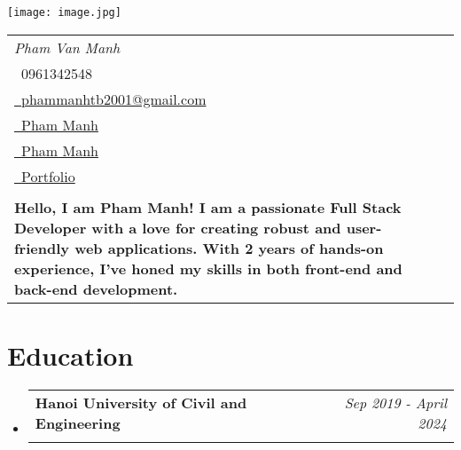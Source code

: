 \documentclass[a4paper,11pt]{article}
\makeatletter
\newcommand{\resumeSubheading}[4]{
\vspace{0.5mm}\item
    \begin{tabular*}{0.98\textwidth}[t]{l@{\extracolsep{\fill}}r}
        \textbf{#1} & \textit{\footnotesize{#4}} \\
        \textit{\footnotesize{#3}} &  \footnotesize{#2}\\
    \end{tabular*}
    \vspace{-2.4mm}
}
\newcommand{\resumeSubHeadingListStart}{\begin{itemize}[leftmargin=*,labelsep=0mm]}
\newcommand{\resumeSubHeadingListEnd}{\end{itemize}\vspace{2mm}}
\newcommand{\name}{Pham Van Manh} %
\newcommand{\phone}{0961342548} %
\newcommand{\emaila}{phammanhtb2001@gmail.com} %
\newcommand{\accountName}{Pham Manh} %
\newcommand{\headline}{Hello, I am Pham Manh! I am a passionate Full Stack Developer with a love for creating robust and user-friendly web applications. With 2 years of hands-on experience, I’ve honed my skills in both front-end and back-end development.}
\makeatother
\begin{document}
\selectfont


\parbox{2.6cm}{%
\texttt{[image: image.jpg]}
}
\parbox{\dimexpr\linewidth-2.9cm\relax}{
\begin{tabularx}{\linewidth}{L r} \\
  \textit{\Large \name} \\ {\raisebox{0.0\height}{\footnotesize \faPhone}\ \phone}\\
\href{mailto:\emaila}{\raisebox{0.0\height}{\footnotesize \faEnvelope}\ {\emaila}} \\
 \href{https://github.com/manhpvxj}{\raisebox{0.0\height}{\footnotesize \faGithub}\ {\accountName}} \\
  \href{https://www.linkedin.com/in/manhpvxj/}{\raisebox{0.0\height}{\footnotesize \faLinkedin}\ {\accountName}} \\
  \href{https:/manhtheweeb.id.vn}{\raisebox{0.0\height}{\footnotesize \faLink}\ {Portfolio}} \\ \\
  \textbf{\headline}
\end{tabularx}
}





\section{\textbf{Education}}
  \resumeSubHeadingListStart
    \resumeSubheading
      {Hanoi University of Civil and Engineering}{}
      {}{Sep 2019 - April 2024}
  \resumeSubHeadingListEnd
%



\end{document}
